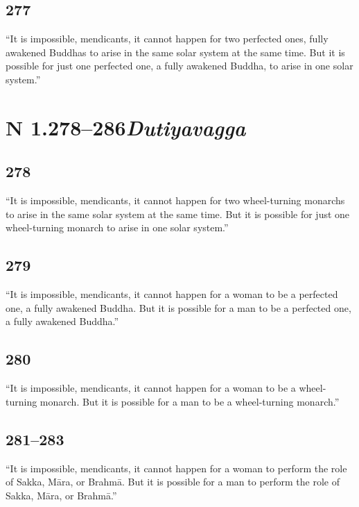 \documentclass[12pt,openany]{book}%
\newcommand*{\suttatitleacronym}[1]{\smaller[2]{#1}\vspace*{.3em}}
\newcommand*{\suttatitleroot}[1]{\linebreak\smaller[2]\itshape{#1}}
\newcommand*{\tocacronym}[1]{\hspace*{-3.3em}{#1}\quad}
\newcommand*{\tocroot}[1]{(\textit{#1})}
\begin{document}
\subsection*{277 }

“It is impossible, mendicants, it cannot happen for two perfected ones, fully awakened Buddhas to arise in the same solar system at the same time. But it is possible for just one perfected one, a fully awakened Buddha, to arise in one solar system.” 

%
\section*{{\suttatitleacronym AN 1.278–286}{\suttatitleroot Dutiyavagga}}
\addcontentsline{toc}{section}{\tocacronym{AN 1.278–286} \tocroot{Dutiyavagga}}

\subsection*{278 }

“It is impossible, mendicants, it cannot happen for two wheel-turning monarchs to arise in the same solar system at the same time. But it is possible for just one wheel-turning monarch to arise in one solar system.” 

\subsection*{279 }

“It is impossible, mendicants, it cannot happen for a woman to be a perfected one, a fully awakened Buddha. But it is possible for a man to be a perfected one, a fully awakened Buddha.” 

\subsection*{280 }

“It is impossible, mendicants, it cannot happen for a woman to be a wheel-turning monarch. But it is possible for a man to be a wheel-turning monarch.” 

\subsection*{281–283 }

“It is impossible, mendicants, it cannot happen for a woman to perform the role of Sakka, \textsanskrit{Māra}, or \textsanskrit{Brahmā}. But it is possible for a man to perform the role of Sakka, \textsanskrit{Māra}, or \textsanskrit{Brahmā}.” 
\end{document}
